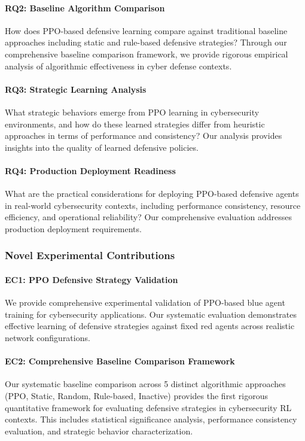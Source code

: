 \documentclass[12pt,oneside]{article}
\begin{document}
\paragraph{RQ2: Baseline Algorithm Comparison}
How does PPO-based defensive learning compare against traditional baseline approaches including static and rule-based defensive strategies? Through our comprehensive baseline comparison framework, we provide rigorous empirical analysis of algorithmic effectiveness in cyber defense contexts.

\paragraph{RQ3: Strategic Learning Analysis}
What strategic behaviors emerge from PPO learning in cybersecurity environments, and how do these learned strategies differ from heuristic approaches in terms of performance and consistency? Our analysis provides insights into the quality of learned defensive policies.

\paragraph{RQ4: Production Deployment Readiness}
What are the practical considerations for deploying PPO-based defensive agents in real-world cybersecurity contexts, including performance consistency, resource efficiency, and operational reliability? Our comprehensive evaluation addresses production deployment requirements.

\subsubsection{Novel Experimental Contributions}

\paragraph{EC1: PPO Defensive Strategy Validation}
We provide comprehensive experimental validation of PPO-based blue agent training for cybersecurity applications. Our systematic evaluation demonstrates effective learning of defensive strategies against fixed red agents across realistic network configurations.

\paragraph{EC2: Comprehensive Baseline Comparison Framework}
Our systematic baseline comparison across 5 distinct algorithmic approaches (PPO, Static, Random, Rule-based, Inactive) provides the first rigorous quantitative framework for evaluating defensive strategies in cybersecurity RL contexts. This includes statistical significance analysis, performance consistency evaluation, and strategic behavior characterization.
\end{document}
